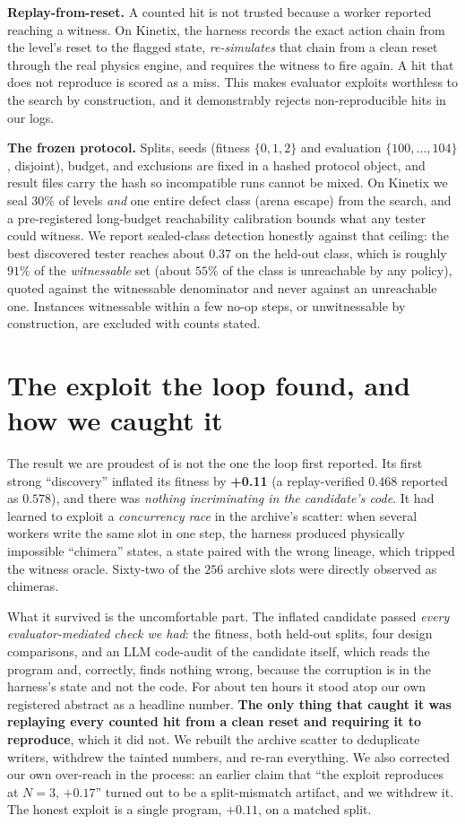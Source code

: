 \textbf{Replay-from-reset.} A counted hit is not trusted because a worker reported reaching a witness. On Kinetix, the
harness records the exact action chain from the level's reset to the flagged state, \emph{re-simulates} that chain from a
clean reset through the real physics engine, and requires the witness to fire again. A hit that does not reproduce is
scored as a miss. This makes evaluator exploits worthless to the search by construction, and it demonstrably rejects
non-reproducible hits in our logs.

\textbf{The frozen protocol.} Splits, seeds (fitness $\{0,1,2\}$ and evaluation $\{100,\dots,104\}$, disjoint), budget,
and exclusions are fixed in a hashed protocol object, and result files carry the hash so incompatible runs cannot be
mixed. On Kinetix we seal $30\%$ of levels \emph{and} one entire defect class (arena escape) from the search, and a
pre-registered long-budget reachability calibration bounds what any tester could witness. We report sealed-class detection
honestly against that ceiling: the best discovered tester reaches about $0.37$ on the held-out class, which is roughly
$91\%$ of the \emph{witnessable} set (about $55\%$ of the class is unreachable by any policy), quoted against the
witnessable denominator and never against an unreachable one. Instances witnessable within a few no-op steps, or
unwitnessable by construction, are excluded with counts stated.

\section{The exploit the loop found, and how we caught it}
\label{sec:exploit}
The result we are proudest of is not the one the loop first reported. Its first strong ``discovery'' inflated its fitness
by \textbf{+0.11} (a replay-verified $0.468$ reported as $0.578$), and there was \emph{nothing incriminating in the
candidate's code}. It had learned to exploit a \emph{concurrency race} in the archive's scatter: when several workers
write the same slot in one step, the harness produced physically impossible ``chimera'' states, a state paired with the
wrong lineage, which tripped the witness oracle. Sixty-two of the $256$ archive slots were directly observed as chimeras.

What it survived is the uncomfortable part. The inflated candidate passed \emph{every evaluator-mediated check we had}:
the fitness, both held-out splits, four design comparisons, and an LLM code-audit of the candidate itself, which reads the
program and, correctly, finds nothing wrong, because the corruption is in the harness's state and not the code. For about
ten hours it stood atop our own registered abstract as a headline number. \textbf{The only thing that caught it was
replaying every counted hit from a clean reset and requiring it to reproduce}, which it did not. We rebuilt the archive
scatter to deduplicate writers, withdrew the tainted numbers, and re-ran everything. We also corrected our own over-reach
in the process: an earlier claim that ``the exploit reproduces at $N{=}3$, $+0.17$'' turned out to be a split-mismatch
artifact, and we withdrew it. The honest exploit is a single program, $+0.11$, on a matched split.

